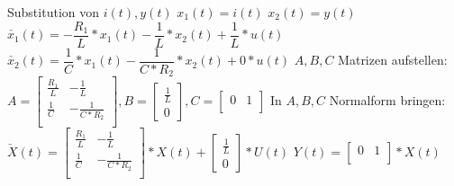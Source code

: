 \documentclass[11pt, a4paper, twoside]{article}   	%
\begin{document}
\newline
\newline
\newline
\newline
Substitution von $i(t), y(t)$
\newline
\newline
$x_{1}(t) = i(t)$
\newline
\newline
$x_{2}(t) = y(t)$
\newline
\newline
$\check{x_{1}}(t) = - \dfrac{R_{1}}{L} * x_{1}(t) - \dfrac{1}{L} * x_{2}(t) + \dfrac{1}{L} * u(t)$
\newline
$\check{x_{2}}(t) = \dfrac{1}{C} * x_{1}(t) - \dfrac{1}{C * R_{2}} * x_{2}(t) + 0 * u(t)$
\newline
\newline
\newline
\newline
$A, B, C$ Matrizen aufstellen:
\newline
\newline
$
A = \begin{bmatrix}
	\frac{R_{1}}{L} & -\frac{1}{L} \\[0.3em]
    \frac{1}{C}     & -\frac{1}{C*R_{2}} \\[0.3em]
\end{bmatrix}
,
B =  \begin{bmatrix}
	\frac{1}{L} \\[0.3em]
	0
\end{bmatrix}
,
C =  \begin{bmatrix}
	0 & 1 \\[0.3em]
\end{bmatrix}
$
\newpage
\parindent0pt In $A, B, C$ Normalform bringen:
\newline
\newline
$
\check{X}(t) = 
\begin{bmatrix}
	\frac{R_{1}}{L} & -\frac{1}{L} \\[0.3em]
    \frac{1}{C}     & -\frac{1}{C*R_{2}} \\[0.3em]
\end{bmatrix}
 * X(t) + 
\begin{bmatrix}
	\frac{1}{L} \\[0.3em]
	0
\end{bmatrix}
 * U(t)
$
\newline
\newline
\newline
$
Y(t) = 
\begin{bmatrix}
	0 & 1 \\[0.3em]
\end{bmatrix}
 *X(t)
$
\newpage
\end{document}
